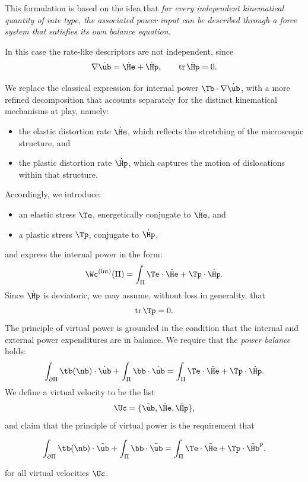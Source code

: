This formulation is based on the idea that
 \textit{for every independent kinematical quantity of rate type, the associated power input can be described through a force system that satisfies its own balance equation.}

In this case the rate-like descriptors are not independent, since
\begin{equation}\label{constr}
\nabla\dot\ub=\dot\He+\dot\Hp, \qquad \operatorname{tr}\dot\Hp=0.
\end{equation}


We replace the classical expression for internal power $\Tb\cdot\nabla\dot\ub$, with a more refined decomposition that accounts separately for the distinct kinematical mechanisms at play, namely:
\begin{itemize}
	\item the elastic distortion rate $\dot\He$, which reflects the stretching of the microscopic structure, and
	\item the plastic distortion rate $\dot\Hp$, which captures the motion of dislocations within that structure.
\end{itemize}

Accordingly, we introduce:
\begin{itemize}
	\item an elastic stress  $\Te$, energetically conjugate to $\dot\He$, and
	\item a plastic stress $\Tp$, conjugate to $\dot\Hp$,
\end{itemize}
and express the internal power in the form:
\begin{equation}\label{intpPL}
\Wc^{\rm(int)}(\Pi)=\int_\Pi \Te\cdot\dot\He+\Tp\cdot\dot\Hp.
\end{equation}
Since $\dot\Hp$ is deviatoric, we may assume, without loss in generality, that 
\begin{equation}
\operatorname{tr}\Tp=0.
\end{equation}
The principle of virtual power is grounded in the condition that the internal and external power expenditures are in balance. We require that the \textit{power balance} holds:
\begin{equation}
\int_{\partial\Pi}\tb(\nb)\cdot\dot\ub+\int_\Pi\bb\cdot\dot\ub=\int_\Pi\Te\cdot\dot\He+\Tp\cdot\dot\Hp.
\end{equation}
We define a virtual velocity to be the list
\begin{equation}
\Uc=\{ \tilde\ub, \tilde\He, \tilde \Hp  \},
\end{equation}
and claim that the principle of virtual power is the requirement that
\begin{definition}
\begin{equation}\label{PVPpla}
\int_{\partial\Pi}\tb(\nb)\cdot\tilde\ub+\int_\Pi\bb\cdot\tilde\ub=\int_\Pi\Te\cdot\tilde\He+\Tp\cdot\tilde\Hb^{\rm p},
\end{equation}
\end{definition}
for all virtual velocities $\Uc$.

